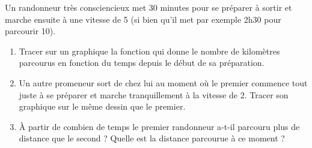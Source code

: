 
\begin{exercice}\label{exosmath-0452}

    Un randonneur très consciencieux met \( 30\) minutes pour se préparer à sortir et marche ensuite à une vitesse de \unit{5}{\kilo\meter\per\hour} (si bien qu'il met par exemple 2h30 pour parcourir \unit{10}{\kilo\meter}).
    \begin{enumerate}
        \item
            Tracer sur un graphique la fonction qui donne le nombre de kilomètres parcourus en fonction du temps depuis le début de sa préparation.
        \item
            Un autre promeneur sort de chez lui au moment où le premier commence tout juste à se préparer et marche tranquillement à la vitesse de \unit{2}{\kilo\meter\per\hour}. Tracer son graphique sur le même dessin que le premier.
        \item
            À partir de combien de temps le premier randonneur a-t-il parcouru plus de distance que le second ? Quelle est la distance parcourue à ce moment ?
    \end{enumerate}

\end{exercice}
